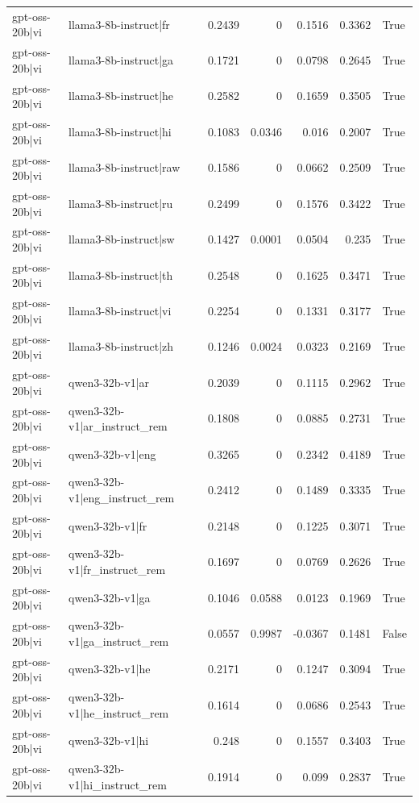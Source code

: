 \begin{table}
\begin{tabular}{l l r r r r l}
gpt-oss-20b|vi & llama3-8b-instruct|fr & 0.2439 & 0 & 0.1516 & 0.3362 & True \\
gpt-oss-20b|vi & llama3-8b-instruct|ga & 0.1721 & 0 & 0.0798 & 0.2645 & True \\
gpt-oss-20b|vi & llama3-8b-instruct|he & 0.2582 & 0 & 0.1659 & 0.3505 & True \\
gpt-oss-20b|vi & llama3-8b-instruct|hi & 0.1083 & 0.0346 & 0.016 & 0.2007 & True \\
gpt-oss-20b|vi & llama3-8b-instruct|raw & 0.1586 & 0 & 0.0662 & 0.2509 & True \\
gpt-oss-20b|vi & llama3-8b-instruct|ru & 0.2499 & 0 & 0.1576 & 0.3422 & True \\
gpt-oss-20b|vi & llama3-8b-instruct|sw & 0.1427 & 0.0001 & 0.0504 & 0.235 & True \\
gpt-oss-20b|vi & llama3-8b-instruct|th & 0.2548 & 0 & 0.1625 & 0.3471 & True \\
gpt-oss-20b|vi & llama3-8b-instruct|vi & 0.2254 & 0 & 0.1331 & 0.3177 & True \\
gpt-oss-20b|vi & llama3-8b-instruct|zh & 0.1246 & 0.0024 & 0.0323 & 0.2169 & True \\
gpt-oss-20b|vi & qwen3-32b-v1|ar & 0.2039 & 0 & 0.1115 & 0.2962 & True \\
gpt-oss-20b|vi & qwen3-32b-v1|ar_instruct_rem & 0.1808 & 0 & 0.0885 & 0.2731 & True \\
gpt-oss-20b|vi & qwen3-32b-v1|eng & 0.3265 & 0 & 0.2342 & 0.4189 & True \\
gpt-oss-20b|vi & qwen3-32b-v1|eng_instruct_rem & 0.2412 & 0 & 0.1489 & 0.3335 & True \\
gpt-oss-20b|vi & qwen3-32b-v1|fr & 0.2148 & 0 & 0.1225 & 0.3071 & True \\
gpt-oss-20b|vi & qwen3-32b-v1|fr_instruct_rem & 0.1697 & 0 & 0.0769 & 0.2626 & True \\
gpt-oss-20b|vi & qwen3-32b-v1|ga & 0.1046 & 0.0588 & 0.0123 & 0.1969 & True \\
gpt-oss-20b|vi & qwen3-32b-v1|ga_instruct_rem & 0.0557 & 0.9987 & -0.0367 & 0.1481 & False \\
gpt-oss-20b|vi & qwen3-32b-v1|he & 0.2171 & 0 & 0.1247 & 0.3094 & True \\
gpt-oss-20b|vi & qwen3-32b-v1|he_instruct_rem & 0.1614 & 0 & 0.0686 & 0.2543 & True \\
gpt-oss-20b|vi & qwen3-32b-v1|hi & 0.248 & 0 & 0.1557 & 0.3403 & True \\
gpt-oss-20b|vi & qwen3-32b-v1|hi_instruct_rem & 0.1914 & 0 & 0.099 & 0.2837 & True \\

\end{tabular}
\end{table}
